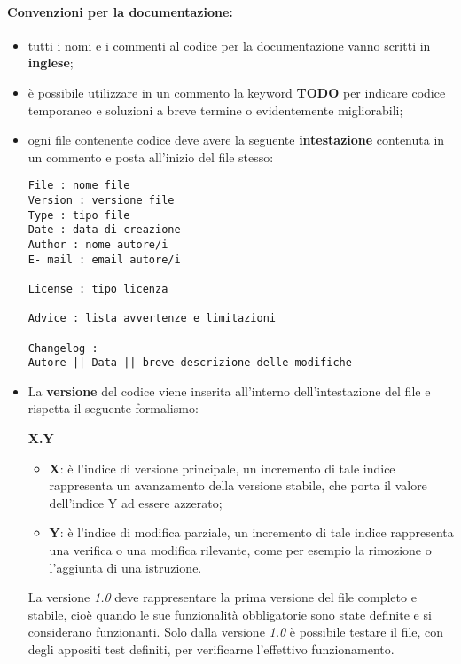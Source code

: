 \documentclass[NormeDiProgetto.tex]{subfiles}
\begin{document}
\paragraph*{Convenzioni per la documentazione: }
\begin{itemize}
	\item tutti i nomi e i commenti al codice per la documentazione vanno scritti in \textbf{inglese};
	\item è possibile utilizzare in un commento la keyword \textbf{TODO} per indicare codice temporaneo e soluzioni a breve termine o evidentemente migliorabili;
	\item ogni file contenente codice deve avere la seguente \textbf{intestazione} contenuta in un commento e posta all'inizio del file stesso:
\begin{center}{
\begin{minipage}{12cm}
\begin{Verbatim}[frame=single]
File : nome file
Version : versione file
Type : tipo file
Date : data di creazione
Author : nome autore/i
E- mail : email autore/i

License : tipo licenza

Advice : lista avvertenze e limitazioni

Changelog :
Autore || Data || breve descrizione delle modifiche
\end{Verbatim}
\end{minipage}
}
\end{center}
	\item La \textbf{versione} del codice viene inserita all’interno dell’intestazione del file e rispetta il
	seguente formalismo:
	\begin{center}{\textbf{X.Y}}\end{center}	
	\begin{itemize}
		\item \textbf{X}: è l’indice di versione principale, un incremento di tale indice rappresenta un avanzamento della versione stabile, che porta il valore dell’indice Y ad essere azzerato;
		\item \textbf{Y}: è l’indice di modifica parziale, un incremento di tale indice rappresenta una verifica o una modifica rilevante, come per esempio la rimozione o l’aggiunta di una istruzione.
	\end{itemize}
	La versione \textit{1.0} deve rappresentare la prima versione del file completo e stabile, cioè quando le sue funzionalità obbligatorie sono state definite e si considerano funzionanti. Solo dalla versione \textit{1.0} è possibile testare il file, con degli appositi test definiti, per	verificarne l’effettivo funzionamento.
\end{itemize}
\end{document}
